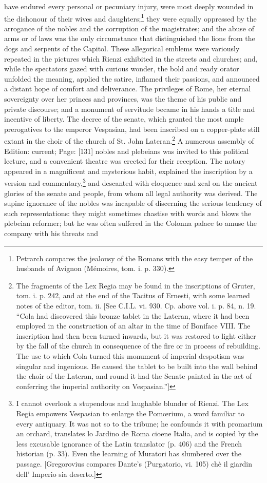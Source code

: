 have endured every personal or pecuniary injury, were most deeply wounded in the dishonour of their wives and daughters;\footnote{Petrarch compares the jealousy of the Romans with the easy temper of the husbands of Avignon (Mémoires, tom. i. p. 330).} they were equally oppressed by the arrogance of the nobles and the corruption of the magistrates; and the abuse of arms or of laws was the only circumstance that distinguished the lions from the dogs and serpents of the Capitol. These allegorical emblems were variously repeated in the pictures which Rienzi exhibited in the streets and churches; and, while the spectators gazed with curious wonder, the bold and ready orator unfolded the meaning, applied the satire, inflamed their passions, and announced a distant hope of comfort and deliverance. The privileges of Rome, her eternal sovereignty over her princes and provinces, was the theme of his public and private discourse; and a monument of servitude became in his hands a title and incentive of liberty. The decree of the senate, which granted the most ample prerogatives to the emperor Vespasian, had been inscribed on a copper-plate still extant in the choir of the church of St. John Lateran.\footnote{The fragments of the Lex Regia may be found in the inscriptions of Gruter, tom. i. p. 242, and at the end of the Tacitus of Ernesti, with some learned notes of the editor, tom. ii. [See C.I.L. vi. 930. Cp. above vol. i. p. 84, n. 19. \texthebrew{“}Cola had discovered this bronze tablet in the Lateran, where it had been employed in the construction of an altar in the time of Boniface VIII. The inscription had then been turned inwards, but it was restored to light either by the fall of the church in consequence of the fire or in process of rebuilding. The use to which Cola turned this monument of imperial despotism was singular and ingenious. He caused the tablet to be built into the wall behind the choir of the Lateran, and round it had the Senate painted in the act of conferring the imperial authority on Vespasian.\texthebrew{}”]} A numerous assembly of Edition: current; Page: [131] nobles and plebeians was invited to this political lecture, and a convenient theatre was erected for their reception. The notary appeared in a magnificent and mysterious habit, explained the inscription by a version and commentary,\footnote{I cannot overlook a stupendous and laughable blunder of Rienzi. The Lex Regia empowers Vespasian to enlarge the Pomœrium, a word familiar to every antiquary. It was not so to the tribune; he confounds it with promarium an orchard, translates lo Jardino de Roma cioene Italia, and is copied by the less excusable ignorance of the Latin translator (p. 406) and the French historian (p. 33). Even the learning of Muratori has slumbered over the passage. [Gregorovius compares Dante\texthebrew{}’s (Purgatorio, vi. 105) chè il giardin dell\texthebrew{}’ Imperio sia deserto.]} and descanted with eloquence and zeal on the ancient glories of the senate and people, from whom all legal authority was derived. The supine ignorance of the nobles was incapable of discerning the serious tendency of such representations: they might sometimes chastise with words and blows the plebeian reformer; but he was often suffered in the Colonna palace to amuse the company with his threats and 